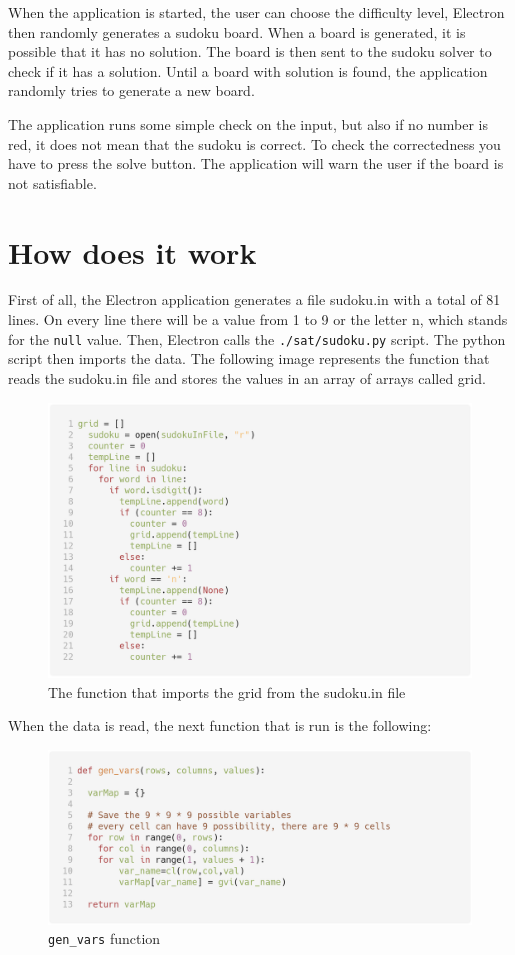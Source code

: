 \documentclass[10pt]{article}
\begin{document}
When the application is started, the user can choose the difficulty level, Electron then
randomly generates a sudoku board. When a board is generated, it is possible that
it has no solution. The board is then sent to the sudoku solver to check
if it has a solution. Until a board with solution is found, the application
randomly tries to generate a new board.

The application runs some simple check on the input, but also if
no number is red, it does not mean that the sudoku is correct. To check the correctedness
you have to press the solve button.
The application will warn the user if the board is not satisfiable.

\section*{How does it work}
First of all, the Electron application generates a file sudoku.in with a total of
81 lines. On every line there will be a value from 1 to 9 or the letter n, which stands
for the \texttt{null} value.
Then, Electron calls the \texttt{./sat/sudoku.py} script.
The python script then imports the data. The following image represents the function that reads the sudoku.in
file and stores the values in an array of arrays called grid.

\begin{figure}[H]
  \centering
  \includegraphics[width=\textwidth]{readFile.png}
  \caption{The function that imports the grid from the sudoku.in file}
\end{figure}
\clearpage

When the data is read, the next function that is run is the following:

\begin{figure}[H]
  \centering
  \includegraphics[width=\textwidth]{genVars.png}
  \caption{\texttt{gen\_vars} function}
\end{figure}
\end{document}
